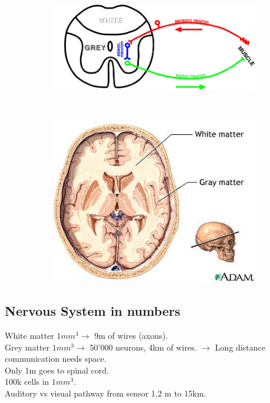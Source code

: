 \documentclass[english,11pt]{article}
\begin{document}
\begin{figure}[H]
        \centering
        \begin{subfigure}[b]{0.5\textwidth}
                \centering
				\includegraphics[width=\textwidth]{motor-sensory-neuron.png}
        \end{subfigure}%
        ~
        \begin{subfigure}[b]{0.5\textwidth}
                \centering
				\includegraphics[width=\textwidth]{brain-cut.png}
        \end{subfigure}
\end{figure}

\subsection{Nervous System in numbers}
White matter $1mm^3\rightarrow$ 9m of wires (axons).\\
Grey matter $1mm^3\rightarrow$ 50'000 neurons, 4km of wires. 
$\rightarrow$ Long distance communication needs space.\\
Only 1m goes to spinal cord.\\
100k cells in $1 mm^3$.\\
Auditory vs visual pathway from sensor 1.2 m to 15km.
\end{document}

